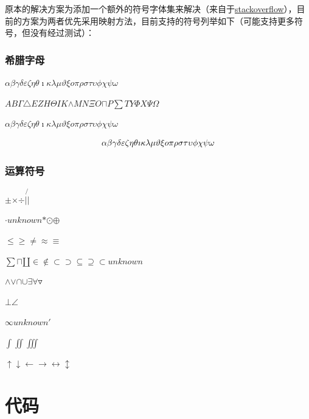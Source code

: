 \documentclass{article}%
\begin{document}
%
原本的解决方案为添加一个额外的符号字体集来解决（来自于\href{https://tex.stackexchange.com/questions/69901/how-to-typeset-greek-letters}{stackoverflow}），目前的方案为两者优先采用映射方法，目前支持的符号列举如下（可能支持更多符号，但没有经过测试）：%

%
\subsubsection{希腊字母}%

%
$\alpha{}$$\beta{}$$\gamma{}$$\delta{}$$\varepsilon{}$$\zeta{}$$\eta{}$$\theta{}$$\imath{}$$\kappa{}$$\lambda{}$$\mu{}$$\vartheta{}$$\xi{}$$o{}$$\pi{}$$\rho{}$$\sigma{}$$\tau{}$$\upsilon{}$$\phi{}$$\chi{}$$\psi{}$$\omega{}$%

%
$A{}$$B{}$$\Gamma{}$$\triangle{}$$E{}$$Z{}$$H{}$$\Theta{}$$I{}$$K{}$$\wedge{}$$M{}$$N{}$$\Xi{}$$O{}$$\sqcap{}$$P{}$$\sum{}$$T{}$$Y{}$$\Phi{}$$X{}$$\Psi{}$$\Omega{}$%

%
 $\alpha{}\beta{}\gamma{}\delta{}\varepsilon{}\zeta{}\eta{}\theta{}\imath{}\kappa{}\lambda{}\mu{}\vartheta{}\xi{}o{}\pi{}\rho{}\sigma{}\tau{}\upsilon{}\phi{}\chi{}\psi{}\omega{}$ %

%
\[%
\alpha{}\beta{}\gamma{}\delta{}\varepsilon{}\zeta{}\eta{}\theta{}\imath{}\kappa{}\lambda{}\mu{}\vartheta{}\xi{}o{}\pi{}\rho{}\sigma{}\tau{}\upsilon{}\phi{}\chi{}\psi{}\omega{}\\%
\]%
%
\subsubsection{运算符号}%

%
$\pm{}$$\times{}$$\div{}$$|{}$$\not{|}{}$%

%
$\cdot{}$$unknown$$\ast{}$$\odot{}$$\oplus{}$%

%
$\leq{}$$\geq{}$$\neq{}$$\approx{}$$\equiv{}$%

%
$\sum{}$$\sqcap{}$$\amalg{}$$\in{}$$\notin{}$$\subset{}$$\supset{}$$\subseteq{}$$\supseteq{}$$\subset{}$$unknown$%

%
$\wedge{}$$\vee{}$$\cap{}$$\cup{}$$\exists{}$$\forall{}$$\triangledown{}$%

%
$\bot{}$$\angle{}$%

%
$\infty{}$$unknown$$'{}$%

%
$\int{}$$\iint{}$$\iiint{}$%

%
$\uparrow{}$$\downarrow{}$$\leftarrow{}$$\to{}$$\leftrightarrow{}$$\updownarrow{}$%

%
\section{代码}%
\end{document}
